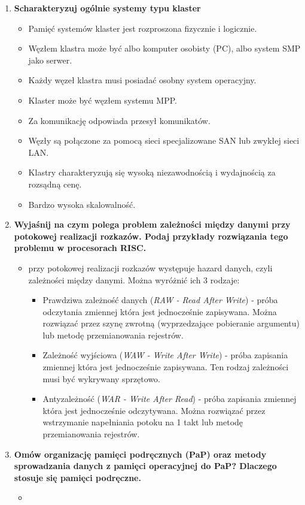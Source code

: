 \begin{enumerate}
\begin{itemize}
			\end{itemize}
			\item \textbf{Scharakteryzuj ogólnie systemy typu klaster}
			\begin{itemize}
				\item Pamięć systemów klaster jest rozproszona fizycznie i logicznie.
				\item Węzłem klastra może być albo komputer osobisty (PC), albo system SMP jako serwer.
				\item Każdy węzeł klastra musi posiadać osobny system operacyjny.
				\item Klaster może być węzłem systemu MPP.
				\item Za komunikację odpowiada przesył komunikatów.
				\item Węzły są połączone za pomocą sieci specjalizowane SAN lub zwykłej sieci LAN.
				\item Klastry charakteryzują się wysoką niezawodnością i wydajnością za rozsądną cenę.
				\item Bardzo wysoka skalowalność.
			\end{itemize}
			\item \textbf{Wyjaśnij na czym polega problem zależności między danymi przy potokowej realizacji rozkazów. Podaj przykłady rozwiązania tego problemu w procesorach RISC.}
			\begin{itemize}
				\item przy potokowej realizacji rozkazów występuje hazard danych, czyli zależności między danymi. Można wyróżnić ich 3 rodzaje:
				\begin{itemize}
					\item Prawdziwa zależność danych (\emph{RAW - Read After Write}) - próba odczytania zmiennej która jest jednocześnie zapisywana. Można rozwiązać przez szynę zwrotną (wyprzedzające pobieranie argumentu) lub metodę przemianowania rejestrów.
					\item Zależność wyjściowa (\emph{WAW - Write After Write}) - próba zapisania zmiennej która jest jednocześnie zapisywana. Ten rodzaj zależności musi być wykrywany sprzętowo.
					\item Antyzależność (\emph{WAR - Write After Read}) - próba zapisania zmiennej która jest jednocześnie odczytywana. Można rozwiązać przez wstrzymanie napełniania potoku na 1 takt lub metodę przemianowania rejestrów.
				\end{itemize}
			\end{itemize}
			\item \textbf{Omów organizację pamięci podręcznych (PaP) oraz metody sprowadzania danych z pamięci operacyjnej do PaP? Dlaczego stosuje się pamięci podręczne.}
			\begin{itemize}
				\item 
			\end{itemize}
		\end{enumerate}
	\newpage
